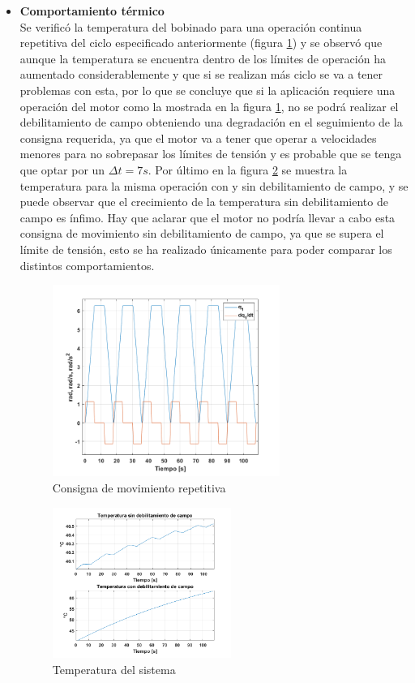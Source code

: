 \documentclass[10pt]{article}
\begin{document}
\begin{itemize}
\item \textbf{Comportamiento térmico}\\
Se verificó la temperatura del bobinado para una operación continua repetitiva del ciclo especificado anteriormente (figura \ref{fig:rep}) y se observó que aunque
la temperatura se encuentra dentro de los límites de operación ha aumentado considerablemente y que si se realizan más ciclo se va a tener problemas con esta, por lo que
se concluye que si la aplicación requiere una operación del motor como la mostrada en la figura \ref{fig:rep}, no se podrá realizar el debilitamiento de campo
 obteniendo una degradación en el seguimiento de la consigna requerida, ya que el motor va a tener que operar a velocidades menores para no sobrepasar los límites de tensión y es probable que se tenga que optar por un
 $\Delta t=7 s$. Por último en la figura \ref{fig:temp} se muestra la temperatura para la misma operación con y sin debilitamiento de campo, y se puede observar que el crecimiento de la temperatura
 sin debilitamiento de campo es ínfimo. Hay que aclarar que el motor no podría llevar a cabo esta consigna de movimiento sin debilitamiento de campo, ya que se supera el límite de tensión,
  esto se ha realizado únicamente para poder comparar los distintos comportamientos.
  \begin{figure}[h!]
	\centering
	\includegraphics[width=0.7\textwidth]{rep.png}
	\caption{\label{fig:rep}Consigna de movimiento repetitiva}
	\end{figure}
	\begin{figure}[h!]
		\centering
		\includegraphics[width=0.55\textwidth]{temp.png}
		\caption{\label{fig:temp}Temperatura del sistema}
		\end{figure}


\end{itemize}
\end{document}
